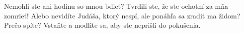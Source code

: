 Nemohli ste ani hodinu so mnou bdieť? Tvrdili ste, že ste ochotní za mňa zomrieť! 
\versseparator
Alebo nevidíte Judáša, ktorý nespí, ale ponáhľa sa zradiť ma židom?
\versseparator
Prečo spíte? Vstaňte a modlite sa, aby ste neprišli do pokušenia.